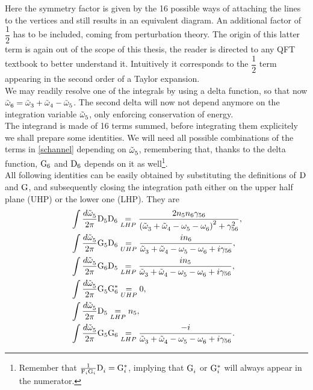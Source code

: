 Here the symmetry factor is given by the 16 possible ways of attaching the lines to the vertices and still results in an equivalent diagram. 
An additional factor of $\dfrac{1}{2}$ has to be included, coming from perturbation theory. The origin of this latter term is again out of the scope of this thesis, the reader is directed
to any QFT textbook to better understand it. Intuitively it corresponds to the $\dfrac{1}{2}$ term appearing in the second order of a Taylor expansion. \\
We may readily resolve one of the integrals by using a delta function, so that now $\tilde{\omega}^{}_6 = \tilde{\omega}^{}_3 + \tilde{\omega}^{}_4 - \tilde{\omega}^{}_5$. The second delta will now not depend 
anymore on the integration variable $\tilde{\omega}^{}_5$, only enforcing conservation of energy. \\
The integrand is made of 16 terms summed, before integrating them explicitely we shall prepare some identities. We will need all possible combinations of 
the terms in \eqref{schannel} depending on $\tilde{\omega}^{}_5$, remembering that, thanks to the delta function, $\mathrm{G}_6$ and $\mathrm{D}_6$ depends on it as well\footnote{
    Remember that $\frac{1}{\mathrm{F}_i \mathrm{G}_i}\mathrm{D}^{}_i = \mathrm{G}_i^*$, implying that $\mathrm{G}^{}_i$ or $\mathrm{G}^{*}_i$ will always appear in the numerator.
}. \\
All following identities can be easily obtained by substituting the definitions of $\mathrm{D}$ and $\mathrm{G}$, and subsequently closing the integration path either 
on the upper half plane (UHP) or the lower one (LHP). They are
\begin{align}
    &\int \frac{d\tilde{\omega}^{}_5}{2\pi} \mathrm{D}_5 \mathrm{D}_6 \underset{LHP}{=} \frac{2n_5n_6\gamma_{56}}{\left( \tilde{\omega}^{}_3 + \tilde{\omega}^{}_4 - \omega^{}_5 - \omega^{}_6\right)^2 + \gamma^2_{56}}, 
    \label{identity1}\\
    &\int \frac{d\tilde{\omega}^{}_5}{2\pi} \mathrm{G}_5 \mathrm{D}_6 \underset{UHP}{=} \frac{in_6}{\tilde{\omega}^{}_3 + \tilde{\omega}^{}_4 - \omega^{}_5 - \omega^{}_6 +i\gamma_{56}}, \\
    &\int \frac{d\tilde{\omega}^{}_5}{2\pi} \mathrm{G}_6 \mathrm{D}_5 \underset{LHP}{=} \frac{in_5}{\tilde{\omega}^{}_3 + \tilde{\omega}^{}_4 - \omega^{}_5 - \omega^{}_6 +i\gamma_{56}}, \\
    &\int \frac{d\tilde{\omega}^{}_5}{2\pi} \mathrm{G}_5^{} \mathrm{G}_6^* \underset{UHP}{=} 0, \\
    &\int \frac{d\tilde{\omega}^{}_5}{2\pi} \mathrm{D}_5 \underset{LHP}{=} n_5, \label{identity5}\\
    &\int \frac{d\tilde{\omega}^{}_5}{2\pi} \mathrm{G}_5\mathrm{G}_6 \underset{LHP}{=} \frac{-i}{\tilde{\omega}^{}_3 + \tilde{\omega}^{}_4 - \omega^{}_5 - \omega^{}_6 +i\gamma_{56}}.
    \label{identity6}
\end{align}  
